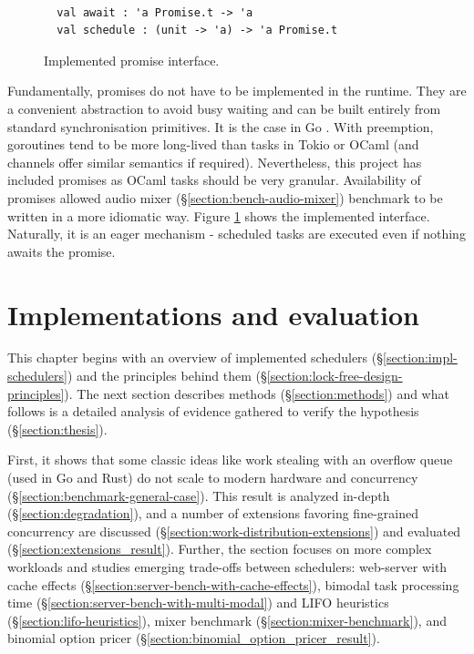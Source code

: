 \documentclass[12pt,a4paper,twoside]{report}
\begin{document}
\begin{figure} 
    \centering
    \begin{verbatim}

  val await : 'a Promise.t -> 'a
  val schedule : (unit -> 'a) -> 'a Promise.t
    \end{verbatim}
    \caption{Implemented promise interface.}
    \label{fig:promise-interface}
\end{figure}


Fundamentally, promises do not have to be implemented in the runtime. They are a convenient abstraction to avoid busy waiting and can be built entirely from standard synchronisation primitives. It is the case in Go \cite{chebyras74:online}. With preemption, goroutines tend to be more long-lived than tasks in Tokio or OCaml (and channels offer similar semantics if required). Nevertheless, this project has included promises as OCaml tasks should be very granular. Availability of promises allowed audio mixer (\S\ref{section:bench-audio-mixer}) benchmark to be written in a more idiomatic way. Figure \ref{fig:promise-interface} shows the implemented interface. Naturally, it is an eager mechanism - scheduled tasks are executed even if nothing awaits the promise. 
 

\chapter{Implementations and evaluation}
\label{chapter:evaluation}

This chapter begins with an overview of implemented schedulers (\S\ref{section:impl-schedulers}) and the principles behind them (\S\ref{section:lock-free-design-principles}). The next section describes methods (\S\ref{section:methods}) and what follows is a detailed analysis of evidence gathered to verify the hypothesis (\S\ref{section:thesis}). 

First, it shows that some classic ideas like work stealing with an overflow queue (used in Go and Rust) do not scale to modern hardware and concurrency (\S\ref{section:benchmark-general-case}). This result is analyzed in-depth (\S\ref{section:degradation}), and a number of extensions favoring fine-grained concurrency are discussed (\S\ref{section:work-distribution-extensions}) and evaluated (\S\ref{section:extensions_result}). Further, the section focuses on more complex workloads and studies emerging trade-offs between schedulers: web-server with cache effects (\S\ref{section:server-bench-with-cache-effects}), bimodal task processing time (\S\ref{section:server-bench-with-multi-modal}) and LIFO heuristics (\S\ref{section:lifo-heuristics}), mixer benchmark (\S\ref{section:mixer-benchmark}), and binomial option pricer (\S\ref{section:binomial_option_pricer_result}).
\end{document}
